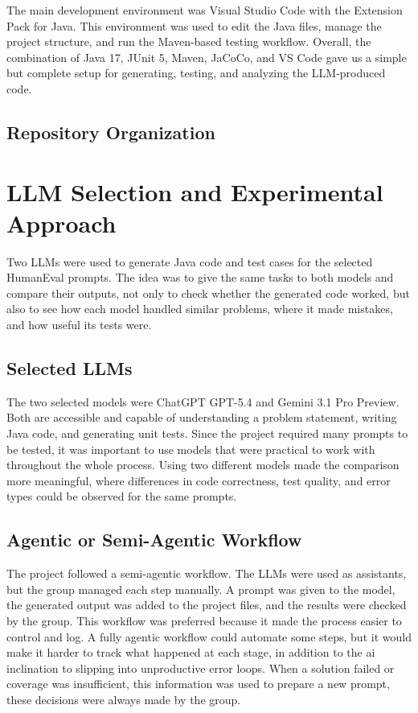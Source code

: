 \documentclass[journal]{IEEEtran}
\begin{document}
The main development environment was Visual Studio Code with the Extension Pack for Java. This environment was used to edit the Java files, manage the project structure, and run the Maven-based testing workflow. Overall, the combination of Java 17, JUnit 5, Maven, JaCoCo, and VS Code gave us a simple but complete setup for generating, testing, and analyzing the LLM-produced code.


\subsection{Repository Organization}


\section{LLM Selection and Experimental Approach}

Two LLMs were used to generate Java code and test cases for the selected HumanEval prompts. The idea was to give the same tasks to both models and compare their outputs, not only to check whether the generated code worked, but also to see how each model handled similar problems, where it made mistakes, and how useful its tests were.


\subsection{Selected LLMs}
The two selected models were ChatGPT GPT-5.4 and Gemini 3.1 Pro Preview. Both are accessible and capable of understanding a problem statement, writing Java code, and generating unit tests. Since the project required many prompts to be tested, it was important to use models that were practical to work with throughout the whole process. Using two different models made the comparison more meaningful, where differences in code correctness, test quality, and error types could be observed for the same prompts.

\subsection{Agentic or Semi-Agentic Workflow}
The project followed a semi-agentic workflow. The LLMs were used as assistants, but the group managed each step manually. A prompt was given to the model, the generated output was added to the project files, and the results were checked by the group. This workflow was preferred because it made the process easier to control and log. A fully agentic workflow could automate some steps, but it would make it harder to track what happened at each stage, in addition to the ai inclination to slipping into unproductive error loops. When a solution failed or coverage was insufficient, this information was used to prepare a new prompt, these decisions were always made by the group.
\end{document}
